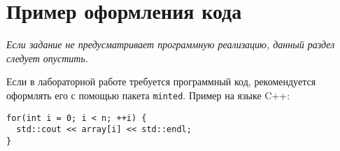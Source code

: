 \section*{Пример оформления кода}
\textit{Если задание не предусматривает программную реализацию, данный раздел следует опустить.}

Если в лабораторной работе требуется программный код, рекомендуется оформлять его с помощью пакета \texttt{minted}. Пример на языке C++:

\begin{verbatim}
for(int i = 0; i < n; ++i) {
  std::cout << array[i] << std::endl;
}
\end{verbatim}